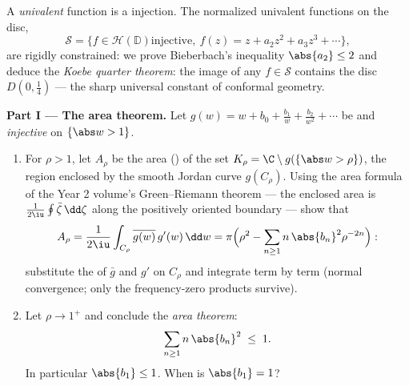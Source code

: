\begin{problem}\label{pb:b3:conformal:1}
A \emph{univalent} function is a  injection. The
normalized univalent functions on the disc,
\[
\mathcal S = \bigl\{f \in \mathcal H(\mathbb D) \text{
injective},\ f(z) = z + a_2z^2 + a_3z^3 + \cdots\bigr\},
\]
are rigidly constrained: we prove Bieberbach's inequality
$\abs{a_2} \leq 2$ and deduce the \emph{Koebe quarter
theorem}: the image of any $f \in \mathcal S$ contains the
disc $D(0, \frac14)$ --- the sharp universal constant of
conformal geometry.

\medskip
\noindent\textbf{Part I --- The area theorem.} Let $g(w) = w
+ b_0 + \frac{b_1}w + \frac{b_2}{w^2} + \cdots$ be 
and \emph{injective} on $\{\abs w > 1\}$.
\begin{enumerate}
  \item For $\rho > 1$, let $A_\rho$ be the area () of the  set $K_\rho = \C\setminus
        g(\{\abs w > \rho\})$, the region enclosed by the
        smooth Jordan curve $g(C_\rho)$. Using the area
        formula of the Year 2 volume's Green--Riemann theorem
        --- the enclosed area is $\frac1{2\iu}
        \oint\bar\zeta\,\dd\zeta$ along the positively
        oriented boundary --- show that
        \[
        A_\rho = \frac{1}{2\iu}\int_{C_\rho}
        \overline{g(w)}\,g'(w)\,\dd w
        = \pi\Bigl(\rho^2 -
        \sum_{n\geq1}n\,\abs{b_n}^2\rho^{-2n}\Bigr) :
        \]
        substitute the  of $\bar g$ and $g'$ on
        $C_\rho$ and integrate term by term (normal
        convergence; only the frequency-zero products
        survive).
  \item Let $\rho \to 1^+$ and conclude the \emph{area
        theorem}:
        \[
        \sum_{n\geq1}n\,\abs{b_n}^2 \;\leq\; 1 .
        \]
        In particular $\abs{b_1} \leq 1$. When is $\abs{b_1}
        = 1$?
\end{enumerate}


\end{problem}
